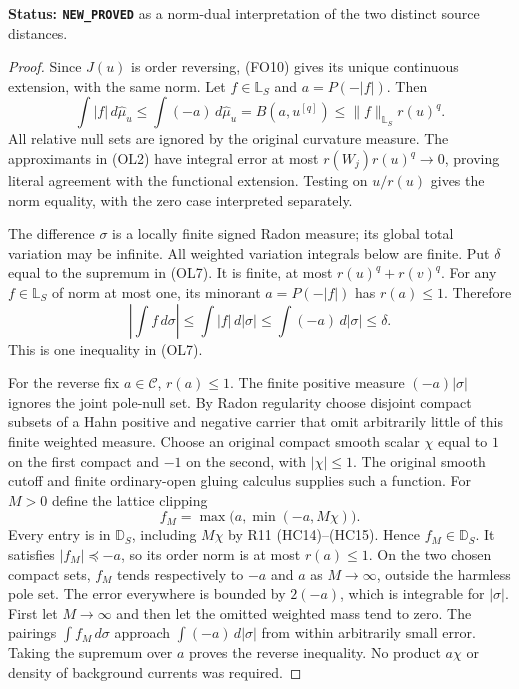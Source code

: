 \noindent\textbf{Status: \texttt{NEW\_PROVED}} as a
norm-dual interpretation of the two distinct source distances.

\begin{proof}
Since $J(u)$ is order reversing, \textup{(FO10)} gives its
unique continuous extension, with the same norm.  Let
$f\in\mathbb L_S$ and $a=P(-|f|)$.  Then
\[
 \int|f|\,d\widehat\mu_u
       \le\int(-a)\,d\widehat\mu_u
       =B(a,u^{[q]})\le\|f\|_{\mathbb L_S}r(u)^q.
 \tag{OL8}
\]
All relative null sets are ignored by the original curvature
measure.  The approximants in \textup{(OL2)} have integral
error at most $r(W_j)r(u)^q\to0$, proving literal agreement
with the functional extension.  Testing on $u/r(u)$ gives
the norm equality, with the zero case interpreted separately.

The difference $\sigma$ is a locally finite signed
Radon measure; its global total variation may be infinite.
All weighted variation integrals below are finite.
Put $\delta$ equal to the supremum in \textup{(OL7)}.
It is finite, at most $r(u)^q+r(v)^q$.
For any $f\in\mathbb L_S$ of norm at most one, its
minorant $a=P(-|f|)$ has $r(a)\le1$.  Therefore
\[
 \left|\int f\,d\sigma\right|
          \le\int|f|\,d|\sigma|
          \le\int(-a)\,d|\sigma|\le\delta.
 \tag{OL9}
\]
This is one inequality in \textup{(OL7)}.

For the reverse fix $a\in\mathscr C$, $r(a)\le1$.
The finite positive measure $(-a)|\sigma|$ ignores the
joint pole-null set.  By Radon regularity choose disjoint
compact subsets of a Hahn positive and negative carrier
that omit arbitrarily little of this finite weighted measure.
Choose an original compact smooth scalar $\chi$ equal to
$1$ on the first compact and $-1$ on the second, with
$|\chi|\le1$.  The original smooth cutoff and finite
ordinary-open gluing calculus supplies such a function.
For $M>0$ define the lattice clipping
\[
                     f_M=\max\bigl(a,\min(-a,M\chi)\bigr).
 \tag{OL10}
\]
Every entry is in $\mathbb D_S$, including $M\chi$ by
R11 \textup{(HC14)--(HC15)}.  Hence $f_M\in\mathbb D_S$.
It satisfies $|f_M|\preceq-a$, so its order norm is at
most $r(a)\le1$.  On the two chosen compact sets,
$f_M$ tends respectively to $-a$ and $a$ as $M\to\infty$,
outside the harmless pole set.  The error everywhere is
bounded by $2(-a)$, which is integrable for $|\sigma|$.
First let $M\to\infty$ and then let the omitted weighted
mass tend to zero.  The pairings $\int f_M\,d\sigma$
approach $\int(-a)\,d|\sigma|$ from within arbitrarily
small error.  Taking the supremum over $a$ proves the
reverse inequality.  No product $a\chi$ or density of
background currents was required.


\end{proof}
